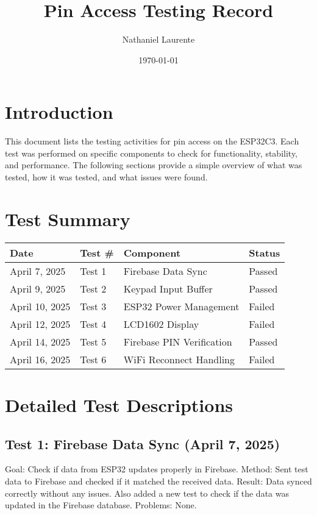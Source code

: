 \documentclass{article}
\title{Pin Access Testing Record}
\author{Nathaniel Laurente}
\date{\today}
\begin{document}
\maketitle

\section*{Introduction}
This document lists the testing activities for pin access on the ESP32C3. Each test was performed on specific components to check for functionality, stability, and performance. The following sections provide a simple overview of what was tested, how it was tested, and what issues were found.

\section*{Test Summary}
\begin{tabular}{| l | l | l | l |}
\hline
\textbf{Date} & \textbf{Test \#} & \textbf{Component} & \textbf{Status} \\
\hline
April 7, 2025 & Test 1 & Firebase Data Sync & Passed \\
April 9, 2025 & Test 2 & Keypad Input Buffer & Passed \\
April 10, 2025 & Test 3 & ESP32 Power Management & Failed \\
April 12, 2025 & Test 4 & LCD1602 Display & Failed \\
April 14, 2025 & Test 5 & Firebase PIN Verification & Passed \\
April 16, 2025 & Test 6 & WiFi Reconnect Handling & Failed \\



\hline
\end{tabular}

\section*{Detailed Test Descriptions}

\subsection*{Test 1: Firebase Data Sync (April 7, 2025)}
Goal: Check if data from ESP32 updates properly in Firebase.
Method: Sent test data to Firebase and checked if it matched the received data.
Result: Data synced correctly without any issues. Also added a new test to check if the data was updated in the Firebase database.
Problems: None.
\end{document}
